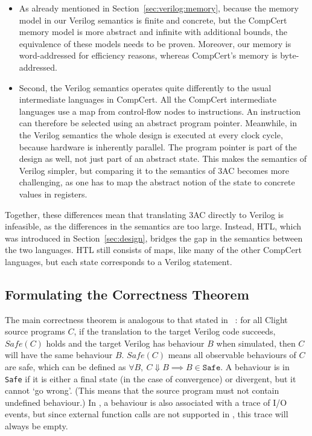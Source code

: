 \begin{itemize}
\item As already mentioned in Section~\ref{sec:verilog:memory}, because the memory model in our Verilog semantics is finite and concrete, but the CompCert memory model is more abstract and infinite with additional bounds, the equivalence of these models needs to be proven.  Moreover, our memory is word-addressed for efficiency reasons, whereas CompCert's memory is byte-addressed.

\item Second, the Verilog semantics operates quite differently to the usual intermediate languages in CompCert.  All the CompCert intermediate languages use a map from control-flow nodes to instructions.  An instruction can therefore be selected using an abstract program pointer. Meanwhile, in the Verilog semantics the whole design is executed at every clock cycle, because hardware is inherently parallel. The program pointer is part of the design as well, not just part of an abstract state. This makes the semantics of Verilog simpler, but comparing it to the semantics of 3AC becomes more challenging, as one has to map the abstract notion of the state to concrete values in registers.
\end{itemize}

Together, these differences mean that translating 3AC directly to Verilog is infeasible, as the differences in the semantics are too large.  Instead, HTL, which was introduced in Section~\ref{sec:design}, bridges the gap in the semantics between the two languages.  HTL still consists of maps, like many of the other CompCert languages, but each state corresponds to a Verilog statement.

\subsection{Formulating the Correctness Theorem}

The main correctness theorem is analogous to that stated in \compcert{}~\cite{leroy09_formal_verif_realis_compil}: for all Clight source programs $C$, if the translation to the target Verilog code succeeds, $\mathit{Safe}(C)$ holds and the target Verilog has behaviour $B$ when simulated, then $C$ will have the same behaviour $B$. $\mathit{Safe}(C)$ means all observable behaviours of $C$ are safe, which can be defined as $\forall B,\ C \Downarrow B \implies B \in \texttt{Safe}$.  A behaviour is in \texttt{Safe} if it is either a final state (in the case of convergence) or divergent, but it cannot `go wrong'. (This means that the source program must not contain undefined behaviour.) In \compcert{}, a behaviour is also associated with a trace of I/O events, but since external function calls are not supported in \vericert{}, this trace will always be empty.

